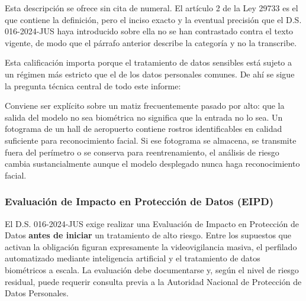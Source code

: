 Esta descripción se ofrece sin cita de numeral. El artículo 2 de la Ley
29733 es el que contiene la definición, pero el inciso exacto y la
eventual precisión que el D.S. 016-2024-JUS haya introducido sobre ella
no se han contrastado contra el texto vigente, de modo que el párrafo
anterior describe la categoría y no la transcribe.

Esta calificación importa porque el tratamiento de datos sensibles está
sujeto a un régimen más estricto que el de los datos personales comunes.
De ahí se sigue la pregunta técnica central de todo este informe:


Conviene ser explícito sobre un matiz frecuentemente pasado por alto: que
la salida del modelo no sea biométrica no significa que la entrada no lo
sea. Un fotograma de un hall de aeropuerto contiene rostros identificables
en calidad suficiente para reconocimiento facial. Si ese fotograma se
almacena, se transmite fuera del perímetro o se conserva para
reentrenamiento, el análisis de riesgo cambia sustancialmente aunque el
modelo desplegado nunca haga reconocimiento facial.

\subsubsection{Evaluación de Impacto en Protección de Datos (EIPD)}
\label{sec:eipd}

El D.S. 016-2024-JUS exige realizar una Evaluación de Impacto en
Protección de Datos \textbf{antes de iniciar} un tratamiento de alto
riesgo. Entre los supuestos que activan la obligación figuran
expresamente la videovigilancia masiva, el perfilado automatizado
mediante inteligencia artificial y el tratamiento de datos biométricos a
escala. La evaluación debe documentarse y, según el nivel de riesgo
residual, puede requerir consulta previa a la Autoridad Nacional de
Protección de Datos Personales.

